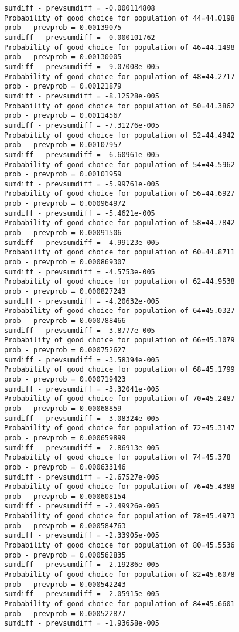 \documentclass[11pt,onecolumn]{article}
\begin{document}
\begin{verbatim}
sumdiff - prevsumdiff = -0.000114808
Probability of good choice for population of 44=44.0198
prob - prevprob = 0.00139075
sumdiff - prevsumdiff = -0.000101762
Probability of good choice for population of 46=44.1498
prob - prevprob = 0.00130005
sumdiff - prevsumdiff = -9.07008e-005
Probability of good choice for population of 48=44.2717
prob - prevprob = 0.00121879
sumdiff - prevsumdiff = -8.12528e-005
Probability of good choice for population of 50=44.3862
prob - prevprob = 0.00114567
sumdiff - prevsumdiff = -7.31276e-005
Probability of good choice for population of 52=44.4942
prob - prevprob = 0.00107957
sumdiff - prevsumdiff = -6.60961e-005
Probability of good choice for population of 54=44.5962
prob - prevprob = 0.00101959
sumdiff - prevsumdiff = -5.99761e-005
Probability of good choice for population of 56=44.6927
prob - prevprob = 0.000964972
sumdiff - prevsumdiff = -5.4621e-005
Probability of good choice for population of 58=44.7842
prob - prevprob = 0.00091506
sumdiff - prevsumdiff = -4.99123e-005
Probability of good choice for population of 60=44.8711
prob - prevprob = 0.000869307
sumdiff - prevsumdiff = -4.5753e-005
Probability of good choice for population of 62=44.9538
prob - prevprob = 0.000827243
sumdiff - prevsumdiff = -4.20632e-005
Probability of good choice for population of 64=45.0327
prob - prevprob = 0.000788466
sumdiff - prevsumdiff = -3.8777e-005
Probability of good choice for population of 66=45.1079
prob - prevprob = 0.000752627
sumdiff - prevsumdiff = -3.58394e-005
Probability of good choice for population of 68=45.1799
prob - prevprob = 0.000719423
sumdiff - prevsumdiff = -3.32041e-005
Probability of good choice for population of 70=45.2487
prob - prevprob = 0.00068859
sumdiff - prevsumdiff = -3.08324e-005
Probability of good choice for population of 72=45.3147
prob - prevprob = 0.000659899
sumdiff - prevsumdiff = -2.86913e-005
Probability of good choice for population of 74=45.378
prob - prevprob = 0.000633146
sumdiff - prevsumdiff = -2.67527e-005
Probability of good choice for population of 76=45.4388
prob - prevprob = 0.000608154
sumdiff - prevsumdiff = -2.49926e-005
Probability of good choice for population of 78=45.4973
prob - prevprob = 0.000584763
sumdiff - prevsumdiff = -2.33905e-005
Probability of good choice for population of 80=45.5536
prob - prevprob = 0.000562835
sumdiff - prevsumdiff = -2.19286e-005
Probability of good choice for population of 82=45.6078
prob - prevprob = 0.000542243
sumdiff - prevsumdiff = -2.05915e-005
Probability of good choice for population of 84=45.6601
prob - prevprob = 0.000522877
sumdiff - prevsumdiff = -1.93658e-005

\end{verbatim}
\end{document}
